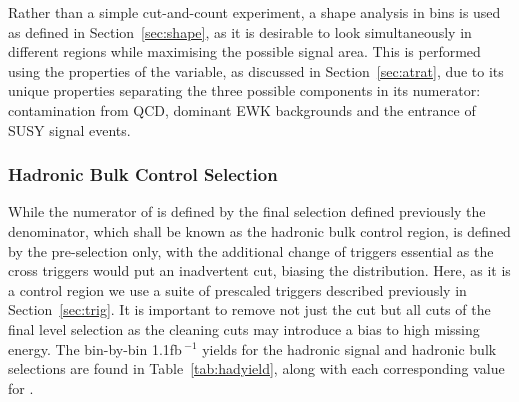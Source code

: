 Rather than a simple cut-and-count experiment, a shape analysis in \HT bins is used as defined in Section~\ref{sec:shape}, as it is desirable to look simultaneously in different \HT regions while maximising the possible signal area. This is performed using the properties of the \RaT variable, as discussed in Section~\ref{sec:atrat}, due to its unique properties separating the three possible components in its numerator: contamination from QCD, dominant EWK backgrounds and the entrance of SUSY signal events.

\subsubsection{Hadronic Bulk Control Selection}
While the numerator of \RaT is defined by the final selection defined previously the denominator, which shall be known as the hadronic bulk control region, is defined by the pre-selection only, with the additional change of triggers essential as the cross triggers would put an inadvertent \MHT cut, biasing the \alt distribution. Here, as it is a control region we use a suite of prescaled \HT triggers described previously in Section~\ref{sec:trig}. It is important to remove not just the \alt cut but all cuts of the final level selection as the cleaning cuts may introduce a bias to high missing energy. The bin-by-bin 1.1fb\,$^{-1}$ yields for the hadronic signal and hadronic bulk selections are found in Table~\ref{tab:hadyield}, along with each corresponding value for \RaT.


